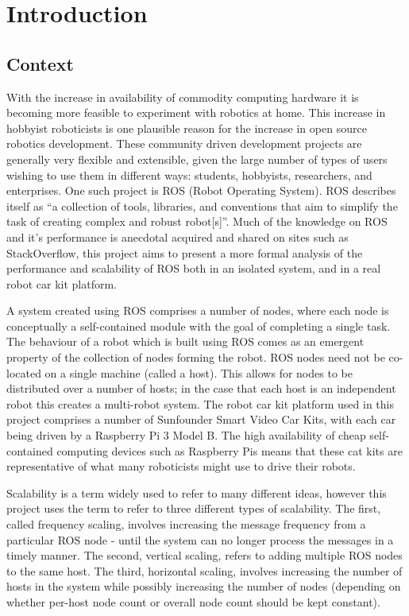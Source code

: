 \documentclass[../dissertation.tex]{subfiles}
\begin{document}
\chapter{Introduction}
\label{introduction-chapter}

\section{Context}

With the increase in availability of commodity computing hardware it is becoming more feasible to experiment with robotics at home. This increase in hobbyist roboticists is one plausible reason for the increase in open source robotics development. These community driven development projects are generally very flexible and extensible, given the large number of types of users wishing to use them in different ways: students, hobbyists, researchers, and enterprises. One such project is ROS (Robot Operating System). ROS describes itself as ``a collection of tools, libraries, and conventions that aim to simplify the task of creating complex and robust robot[s]''\cite{rosaboutpage}. Much of the knowledge on ROS and it's performance is anecdotal acquired and shared on sites such as StackOverflow, this project aims to present a more formal analysis of the performance and scalability of ROS both in an isolated system, and in a real robot car kit platform.

A system created using ROS comprises a number of nodes, where each node is conceptually a self-contained module with the goal of completing a single task. The behaviour of a robot which is built using ROS comes as an emergent property of the collection of nodes forming the robot. ROS nodes need not be co-located on a single machine (called a host). This allows for nodes to be distributed over a number of hosts; in the case that each host is an independent robot this creates a multi-robot system. The robot car kit platform used in this project comprises a number of Sunfounder Smart Video Car Kits\cite{SunfounderRobotCarKit}, with each car being driven by a Raspberry Pi 3 Model B. The high availability of cheap self-contained computing devices such as Raspberry Pis means that these cat kits are representative of what many roboticists might use to drive their robots.

Scalability is a term widely used to refer to many different ideas, however this project uses the term to refer to three different types of scalability. The first, called frequency scaling, involves increasing the message frequency from a particular ROS node - until the system can no longer process the messages in a timely manner. The second, vertical scaling, refers to adding multiple ROS nodes to the same host. The third, horizontal scaling, involves increasing the number of hosts in the system while possibly increasing the number of nodes (depending on whether per-host node count or overall node count should be kept constant).
\end{document}

